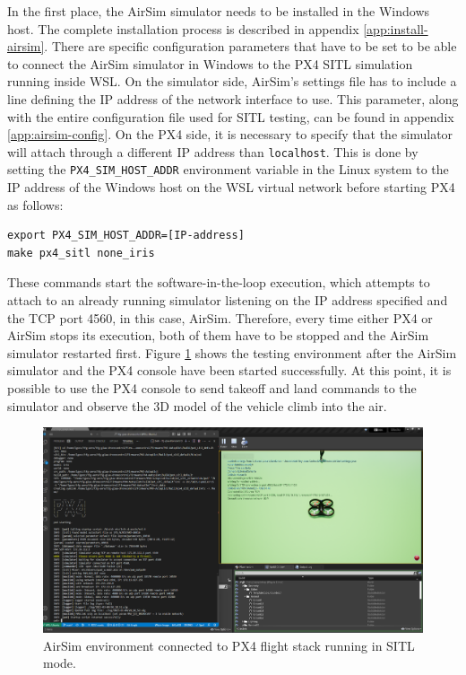 In the first place, the AirSim simulator needs to be installed in the Windows host.
The complete installation process is described in appendix \ref{app:install-airsim}.
There are specific configuration parameters that have to be set to be able to connect the AirSim simulator in Windows to the PX4 SITL simulation running inside WSL.
On the simulator side, AirSim's settings file has to include a line defining the IP address of the network interface to use.
This parameter, along with the entire configuration file used for SITL testing, can be found in appendix \ref{app:airsim-config}.
On the PX4 side, it is necessary to specify that the simulator will attach through a different IP address than \texttt{localhost}.
This is done by setting the \texttt{PX4\_SIM\_HOST\_ADDR} environment variable in the Linux system to the IP address of the Windows host on the WSL virtual network before starting PX4 as follows:
\begin{verbatim}
export PX4_SIM_HOST_ADDR=[IP-address]
make px4_sitl none_iris
\end{verbatim}
These commands start the software-in-the-loop execution, which attempts to attach to an already running simulator listening on the IP address specified and the TCP port 4560, in this case, AirSim.
Therefore, every time either PX4 or AirSim stops its execution, both of them have to be stopped and the AirSim simulator restarted first.
Figure \ref{fig:airsim-sitl} shows the testing environment after the AirSim simulator and the PX4 console have been started successfully.
At this point, it is possible to use the PX4 console to send takeoff and land commands to the simulator and observe the 3D model of the vehicle climb into the air.

\begin{figure}
  \centering
  \includegraphics[width=\textwidth, keepaspectratio]{img/airsim-sitl.png}
  \caption{AirSim environment connected to PX4 flight stack running in SITL mode.}
  \label{fig:airsim-sitl}
\end{figure}

